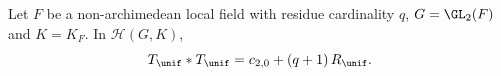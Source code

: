 Let $F$ be a non-archimedean local field with residue cardinality $q$, $G=\GL_2(F)$ and $K=K_F$. In
$\mathcal H(G,K)$,
\[
  T_\unif*T_\unif=c_{2,0}+(q+1)\,R_\unif.
\]

